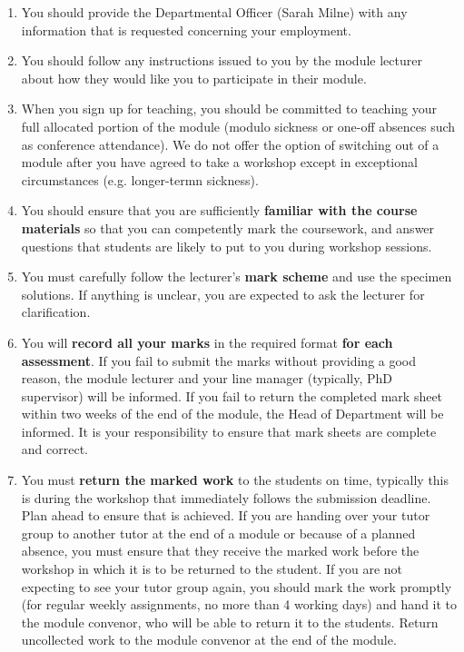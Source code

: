 \documentclass[11pt,a4paper]{amsart}
\begin{document}
\begin{enumerate}
\item You should provide the Departmental Officer (Sarah Milne) with any information that is requested concerning your employment.
\item You should follow any instructions issued to you by the module lecturer about how they would like you to participate in their module.
\item When you sign up for teaching, you should be committed to teaching your full allocated portion of the module (modulo sickness or one-off absences such as conference attendance). We do not offer the option of switching out of a module after you have agreed to take a workshop except in exceptional circumstances (e.g. longer-termn sickness).
\item You should ensure that you are sufficiently {\bf familiar with the course materials} so that you can competently mark the coursework, and answer questions that students are likely to put to you during workshop sessions.
\item You must carefully follow the lecturer's {\bf mark scheme} and use the specimen solutions. If anything is unclear, you are expected to ask the lecturer for clarification.
\item You will {\bf record all your marks} in the required format {\bf for each assessment}. If you fail to submit the marks without providing a good reason, the module lecturer and your line manager (typically, PhD supervisor) will be informed. If you fail to return the completed mark sheet within two weeks of the end of the module, the Head of Department will be informed. It is your responsibility to ensure that mark sheets are complete and correct.
\item You must {\bf return the marked work} to the students on time, typically this is during the workshop that immediately follows the submission deadline. Plan ahead to ensure that is achieved. If you are handing over your tutor group to another tutor at the end of a module or because of a planned absence, you must ensure that they receive the marked work before the workshop in which it is to be returned to the student. If you are not expecting to see your tutor group again, you should mark the work promptly (for regular weekly assignments, no more than 4 working days) and hand it to the module convenor, who will be able to return it to the students. Return uncollected work to the module convenor at the end of the module.

\end{enumerate}
\end{document}
